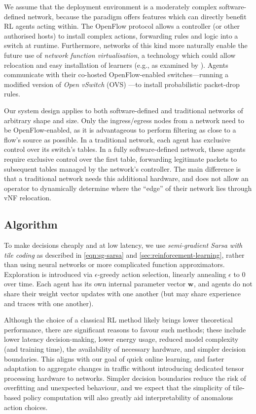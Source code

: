 \documentclass[10pt, times, comsoc]{IEEEtran}
\newcommand{\wvec}[1]{\ensuremath{\bm{w}_{#1}}}
\begin{document}
We assume that the deployment environment is a moderately complex software-defined network, because the paradigm offers features which can directly benefit RL agents acting within.
The OpenFlow protocol allows a controller (or other authorised hosts) to install complex actions, forwarding rules and logic into a switch at runtime.
Furthermore, networks of this kind more naturally enable the future use of \emph{network function virtualisation}, a technology which could allow relocation and easy installation of learners (e.g., as examined by \textcite{TNSM-that-guys-paper}).
Agents communicate with their co-hosted OpenFlow-enabled switches---running a modified version of \emph{Open vSwitch} (OVS) \cite{open-vswitch}---to install probabilistic packet-drop rules.

\cbstart
{\color{revisiontext}
Our system design applies to both software-defined and traditional networks of arbitrary shape and size.
Only the ingress/egress nodes from a network need to be OpenFlow-enabled, as it is advantageous to perform filtering as close to a flow's source as possible.
In a traditional network, each agent has exclusive control over its switch's tables.
In a fully software-defined network, these agents require exclusive control over the first table, forwarding legitimate packets to subsequent tables managed by the network's controller.
The main difference is that a traditional network needs this additional hardware, and does not allow an operator to dynamically determine where the ``edge'' of their network lies through vNF relocation.}
\cbend

\subsection{Algorithm}
To make decisions cheaply and at low latency, we use \emph{semi-gradient Sarsa with tile coding} as described in \cref{eqn:sg-sarsa} and \cref{sec:reinforcement-learning}, rather than using neural networks or more complicated function approximators.
Exploration is introduced via $\epsilon$-greedy action selection, linearly annealing $\epsilon$ to 0 over time.
Each agent has its own internal parameter vector $\wvec{}$, and agents do not share their weight vector updates with one another (but may share experience and traces with one another).

Although the choice of a classical RL method likely brings lower theoretical performance, there are significant reasons to favour such methods; these include lower latency decision-making, lower energy usage, reduced model complexity (and training time), the availability of necessary hardware, and simpler decision boundaries.
This aligns with our goal of quick online learning, and faster adaptation to aggregate changes in traffic without introducing dedicated tensor processing hardware to networks.
Simpler decision boundaries reduce the risk of overfitting and unexpected behaviour, and we expect that the simplicity of tile-based policy computation will also greatly aid interpretability of anomalous action choices.
\end{document}
